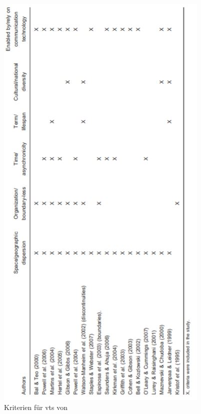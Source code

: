 \documentclass[a4paper,11pt]{article}%
\renewcommand{\\}{\vspace*{0.5\baselineskip} \newline}
\begin{document}
\begin{figure}[H]
		\begin{footnotesize}
			\includegraphics[scale=1]{Abbildungen/criteriaForVirtualTeams.JPG}
			\caption[Abbildung 1]{Kriterien für \ac{vts} von \citep[p. 27]{schweitzer2010conceptualizing}}
			\label{criteriaForVirtualTeams}
		\end{footnotesize}
	\end{figure}	
	
\end{document}
